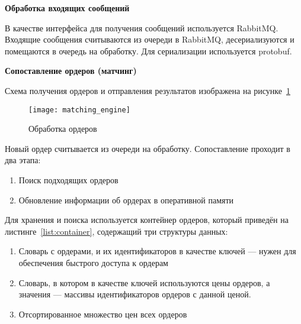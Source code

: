 \textbf{Обработка входящих сообщений}

В качестве интерфейса для получения сообщений используется RabbitMQ.
Входящие сообщения считываются из очереди в RabbitMQ, десериализуются и помещаются в очередь на обработку.
Для сериализации используется protobuf.

\textbf{Сопоставление ордеров (матчинг)}

Схема получения ордеров и отправления результатов изображена на рисунке~\ref{fig:matching_engine}

\begin{figure}[ht]
    \centering
    \texttt{[image: matching\_engine]}
    \caption{Обработка ордеров}\label{fig:matching_engine}
\end{figure}

Новый ордер считывается из очереди на обработку. Сопоставление проходит в два этапа:

\begin{enumerate}
    \item Поиск подходящих ордеров
    \item Обновление информации об ордерах в оперативной памяти
\end{enumerate}

Для хранения и поиска используется контейнер ордеров, который приведён на листинге~\ref{list:container}, содержащий три структуры данных:

\begin{enumerate}
    \item Словарь с ордерами, и их идентификаторов в качестве ключей — нужен для обеспечения быстрого доступа к ордерам
    \item Словарь, в котором в качестве ключей используются цены ордеров, а значения — массивы идентификаторов ордеров с данной ценой.
    \item Отсортированное множество цен всех ордеров
\end{enumerate}



